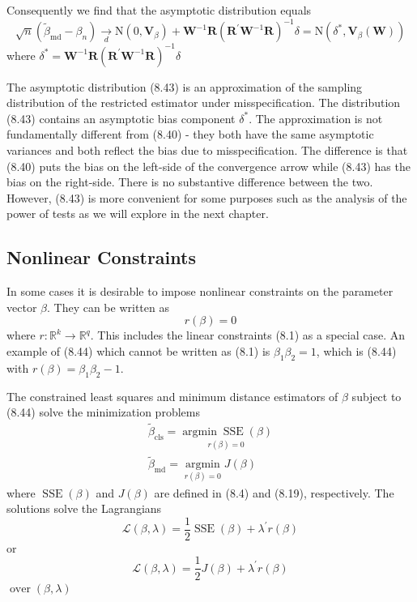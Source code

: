 \documentclass[10pt]{article}
\begin{document}
Consequently we find that the asymptotic distribution equals
$$
\sqrt{n}\left(\widetilde{\beta}_{\mathrm{md}}-\beta_{n}\right) \underset{d}{\longrightarrow} \mathrm{N}\left(0, \boldsymbol{V}_{\beta}\right)+\boldsymbol{W}^{-1} \boldsymbol{R}\left(\boldsymbol{R}^{\prime} \boldsymbol{W}^{-1} \boldsymbol{R}\right)^{-1} \delta=\mathrm{N}\left(\delta^{*}, \boldsymbol{V}_{\beta}(\boldsymbol{W})\right)
$$
where $\delta^{*}=\boldsymbol{W}^{-1} \boldsymbol{R}\left(\boldsymbol{R}^{\prime} \boldsymbol{W}^{-1} \boldsymbol{R}\right)^{-1} \delta$

The asymptotic distribution (8.43) is an approximation of the sampling distribution of the restricted estimator under misspecification. The distribution (8.43) contains an asymptotic bias component $\delta^{*}$. The approximation is not fundamentally different from (8.40) - they both have the same asymptotic variances and both reflect the bias due to misspecification. The difference is that (8.40) puts the bias on the left-side of the convergence arrow while (8.43) has the bias on the right-side. There is no substantive difference between the two. However, (8.43) is more convenient for some purposes such as the analysis of the power of tests as we will explore in the next chapter.

\subsection{Nonlinear Constraints}
In some cases it is desirable to impose nonlinear constraints on the parameter vector $\beta$. They can be written as
$$
r(\beta)=0
$$
where $r: \mathbb{R}^{k} \rightarrow \mathbb{R}^{q}$. This includes the linear constraints (8.1) as a special case. An example of (8.44) which cannot be written as (8.1) is $\beta_{1} \beta_{2}=1$, which is (8.44) with $r(\beta)=\beta_{1} \beta_{2}-1$.

The constrained least squares and minimum distance estimators of $\beta$ subject to (8.44) solve the minimization problems
$$
\begin{gathered}
\widetilde{\beta}_{\mathrm{cls}}=\underset{r(\beta)=0}{\operatorname{argmin} \operatorname{SSE}(\beta)} \\
\widetilde{\beta}_{\mathrm{md}}=\underset{r(\beta)=0}{\operatorname{argmin}} J(\beta)
\end{gathered}
$$
where $\operatorname{SSE}(\beta)$ and $J(\beta)$ are defined in (8.4) and (8.19), respectively. The solutions solve the Lagrangians
$$
\mathscr{L}(\beta, \lambda)=\frac{1}{2} \operatorname{SSE}(\beta)+\lambda^{\prime} r(\beta)
$$
or
$$
\mathscr{L}(\beta, \lambda)=\frac{1}{2} J(\beta)+\lambda^{\prime} r(\beta)
$$
$\operatorname{over}(\beta, \lambda)$
\end{document}
